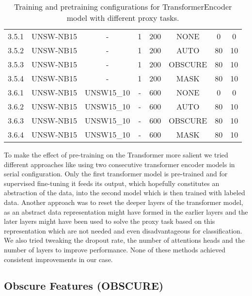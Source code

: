 \begin{table}[H]
{\begin{tabular}{cccccccc}
		3.5.1 & UNSW-NB15    & -          & 1           & 200           & NONE       & 0         & 0           \\
		3.5.2 & UNSW-NB15    & -          & 1           & 200           & AUTO       & 80        & 10          \\
		3.5.3 & UNSW-NB15    & -          & 1           & 200           & OBSCURE      & 80        & 10          \\
		3.5.4 & UNSW-NB15    & -          & 1           & 200           & MASK      & 80        & 10          \\
		3.6.1 & UNSW-NB15    & UNSW15\_10 & -           & 600           & NONE       & 0         & 0           \\
		3.6.2 & UNSW-NB15    & UNSW15\_10 & -           & 600           & AUTO       & 80        & 10          \\
		3.6.3 & UNSW-NB15    & UNSW15\_10 & -           & 600           & OBSCURE      & 80        & 10          \\
		3.6.4 & UNSW-NB15    & UNSW15\_10 & -           & 600           & MASK      & 80        & 10         
	\end{tabular}}
	\caption{Training and pretraining configurations for TransformerEncoder model with different proxy tasks.}
	\label{table:experiments:transformer:configurations}
\end{table}

To make the effect of pre-training on the Transformer more salient we tried different approaches like using two consecutive transformer encoder models in serial configuration. Only the first transformer model is pre-trained and for supervised fine-tuning it feeds its output, which hopefully constitutes an abstraction of the data, into the second model which is then trained with labeled data.
Another approach was to reset the deeper layers of the transformer model, as an abstract data representation might have formed in the earlier layers and the later layers might have been used to solve the proxy task based on this representation which are not needed and even disadvantageous for classification. We also tried tweaking the dropout rate, the number of attentions heads and the number of layers to improve performance. None of these methods achieved consistent improvements in our case.


\subsection{Obscure Features (OBSCURE)} \label{sec:experiments:transformer:mask_feature}

